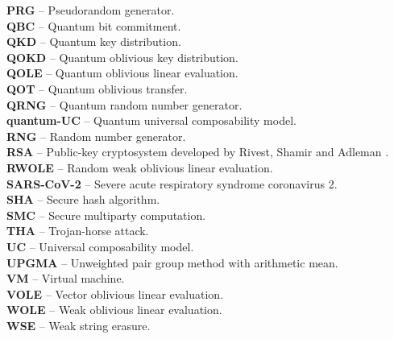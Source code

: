 \textbf{PRG} -- Pseudorandom generator.
\vspace{0.5cm}\\
\textbf{QBC} -- Quantum bit commitment.
\vspace{0.5cm}\\
\textbf{QKD} -- Quantum key distribution.
\vspace{0.5cm}\\
\textbf{QOKD} -- Quantum oblivious key distribution.
\vspace{0.5cm}\\
\textbf{QOLE} -- Quantum oblivious linear evaluation.
\vspace{0.5cm}\\
\textbf{QOT} -- Quantum oblivious transfer.
\vspace{0.5cm}\\
\textbf{QRNG} -- Quantum random number generator.
\vspace{0.5cm}\\
\textbf{quantum-UC} -- Quantum universal composability model.
\vspace{0.5cm}\\
\textbf{RNG} -- Random number generator.
\vspace{0.5cm}\\
\textbf{RSA} -- Public-key cryptosystem developed by Rivest, Shamir and Adleman \cite{RSA78}.
\vspace{0.5cm}\\
\textbf{RWOLE} -- Random weak oblivious linear evaluation.
\vspace{0.5cm}\\
\textbf{SARS-CoV-2} -- Severe acute respiratory syndrome coronavirus 2.
\vspace{0.5cm}\\
\textbf{SHA} -- Secure hash algorithm.
\vspace{0.5cm}\\
\textbf{SMC} -- Secure multiparty computation.
\vspace{0.5cm}\\
\textbf{THA} -- Trojan-horse attack.
\vspace{0.5cm}\\
\textbf{UC} -- Universal composability model.
\vspace{0.5cm}\\
\textbf{UPGMA} -- Unweighted pair group method with arithmetic mean.
\vspace{0.5cm}\\
\textbf{VM} -- Virtual machine.
\vspace{0.5cm}\\
\textbf{VOLE} -- Vector oblivious linear evaluation.
\vspace{0.5cm}\\
\textbf{WOLE} -- Weak oblivious linear evaluation.
\vspace{0.5cm}\\
\textbf{WSE} -- Weak string erasure.
\vspace{0.5cm}\\








